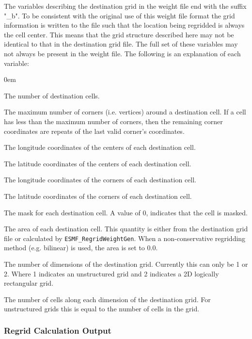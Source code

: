 The variables describing the destination grid in the weight file end with the suffix "\_b". To be consistent with the original use of this weight file format 
the grid information is written to the file such that the location being regridded is always the cell center. This means that the grid structure described here may not be identical to that in the destination grid file. The full set of these variables may not always be present in the weight file. The following is an 
explanation of each variable:
\begin{description}
  \itemsep0em
  \item[n\_b] The number of destination cells. 
  \item[nv\_b] The maximum number of corners (i.e. vertices)  around a destination cell. If a cell has less than the maximum number of corners, then the remaining corner coordinates are repeats of the last valid corner's coordinates.    
  \item[xc\_b] The longitude coordinates of the centers of each destination cell.  
  \item[yc\_b] The latitude coordinates of the centers of each destination cell.  
  \item[xv\_b] The longitude coordinates of the corners of each destination cell.  
  \item[yv\_b] The latitude coordinates of the corners of each destination cell.  
  \item[mask\_b] The mask for each destination cell. A value of 0, indicates that the cell is masked. 
  \item[area\_b] The area of each destination cell. This quantity is either from the destination grid file or calculated by {\tt ESMF\_RegridWeightGen}. When a non-conservative regridding method (e.g. bilinear) is used, the area is set to 0.0. 
 \item[dst\_grid\_rank] The number of dimensions of the destination grid. Currently this can only be 1 or 2. Where 1 indicates an unstructured grid and 2 indicates a 2D logically rectangular grid.
 \item[dst\_grid\_dims] The number of cells along each dimension of the destination grid. For unstructured grids this is equal to the number of cells in the grid. 
\end{description}

\subsubsection{Regrid Calculation Output}\label{regridoutput}

